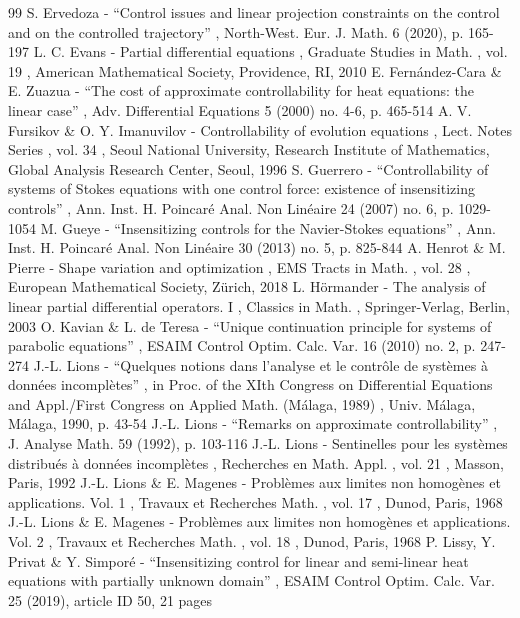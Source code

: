 \documentclass[10pt,a4paper]{amsart}
\theoremstyle{definition}
\begin{document}
\begin{thebibliography}{99}
 S. Ervedoza - “Control issues and linear projection constraints on the control and on the controlled trajectory” , North-West. Eur. J. Math. 6 (2020), p. 165-197
 L. C. Evans - Partial differential equations , Graduate Studies in Math. , vol. 19 , American Mathematical Society, Providence, RI, 2010
 E. Fernández-Cara \& E. Zuazua - “The cost of approximate controllability for heat equations: the linear case” , Adv. Differential Equations 5 (2000) no. 4-6, p. 465-514
 A. V. Fursikov \& O. Y. Imanuvilov - Controllability of evolution equations , Lect. Notes Series , vol. 34 , Seoul National University, Research Institute of Mathematics, Global Analysis Research Center, Seoul, 1996
 S. Guerrero - “Controllability of systems of Stokes equations with one control force: existence of insensitizing controls” , Ann. Inst. H. Poincaré Anal. Non Linéaire 24 (2007) no. 6, p. 1029-1054
 M. Gueye - “Insensitizing controls for the Navier-Stokes equations” , Ann. Inst. H. Poincaré Anal. Non Linéaire 30 (2013) no. 5, p. 825-844
 A. Henrot \& M. Pierre - Shape variation and optimization , EMS Tracts in Math. , vol. 28 , European Mathematical Society, Zürich, 2018
 L. Hörmander - The analysis of linear partial differential operators. I , Classics in Math. , Springer-Verlag, Berlin, 2003
 O. Kavian \& L. de Teresa - “Unique continuation principle for systems of parabolic equations” , ESAIM Control Optim. Calc. Var. 16 (2010) no. 2, p. 247-274
 J.-L. Lions - “Quelques notions dans l’analyse et le contrôle de systèmes à données incomplètes” , in Proc. of the XIth Congress on Differential Equations and Appl./First Congress on Applied Math. (Málaga, 1989) , Univ. Málaga, Málaga, 1990, p. 43-54
 J.-L. Lions - “Remarks on approximate controllability” , J. Analyse Math. 59 (1992), p. 103-116
 J.-L. Lions - Sentinelles pour les systèmes distribués à données incomplètes , Recherches en Math. Appl. , vol. 21 , Masson, Paris, 1992
 J.-L. Lions \& E. Magenes - Problèmes aux limites non homogènes et applications. Vol. 1 , Travaux et Recherches Math. , vol. 17 , Dunod, Paris, 1968
 J.-L. Lions \& E. Magenes - Problèmes aux limites non homogènes et applications. Vol. 2 , Travaux et Recherches Math. , vol. 18 , Dunod, Paris, 1968
 P. Lissy, Y. Privat \& Y. Simporé - “Insensitizing control for linear and semi-linear heat equations with partially unknown domain” , ESAIM Control Optim. Calc. Var. 25 (2019), article ID 50, 21 pages

\end{thebibliography}
\end{document}
